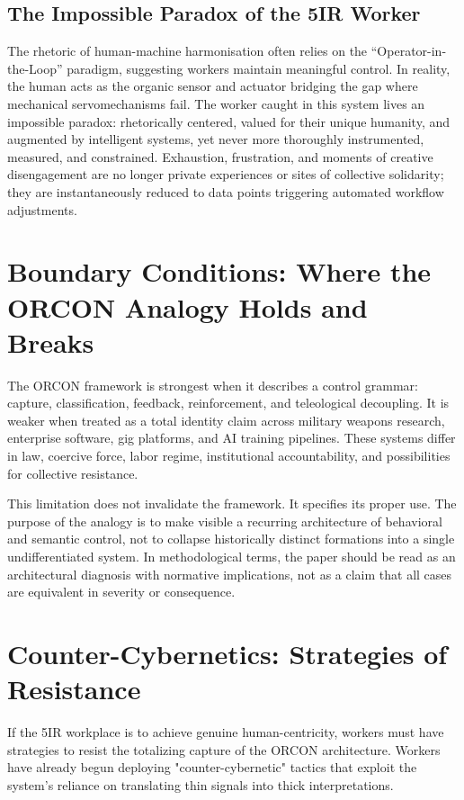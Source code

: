 \documentclass[11pt, a4paper]{article}
\begin{document}
\subsection{The Impossible Paradox of the 5IR Worker}
The rhetoric of human-machine harmonisation often relies on the ``Operator-in-the-Loop'' paradigm, suggesting workers maintain meaningful control. In reality, the human acts as the organic sensor and actuator bridging the gap where mechanical servomechanisms fail. The worker caught in this system lives an impossible paradox: rhetorically centered, valued for their unique humanity, and augmented by intelligent systems, yet never more thoroughly instrumented, measured, and constrained. Exhaustion, frustration, and moments of creative disengagement are no longer private experiences or sites of collective solidarity; they are instantaneously reduced to data points triggering automated workflow adjustments.

\section{Boundary Conditions: Where the ORCON Analogy Holds and Breaks}

The ORCON framework is strongest when it describes a control grammar: capture, classification, feedback, reinforcement, and teleological decoupling. It is weaker when treated as a total identity claim across military weapons research, enterprise software, gig platforms, and AI training pipelines. These systems differ in law, coercive force, labor regime, institutional accountability, and possibilities for collective resistance.

This limitation does not invalidate the framework. It specifies its proper use. The purpose of the analogy is to make visible a recurring architecture of behavioral and semantic control, not to collapse historically distinct formations into a single undifferentiated system. In methodological terms, the paper should be read as an architectural diagnosis with normative implications, not as a claim that all cases are equivalent in severity or consequence.

\section{Counter-Cybernetics: Strategies of Resistance}

If the 5IR workplace is to achieve genuine human-centricity, workers must have strategies to resist the totalizing capture of the ORCON architecture. Workers have already begun deploying "counter-cybernetic" tactics that exploit the system's reliance on translating thin signals into thick interpretations.
\end{document}
